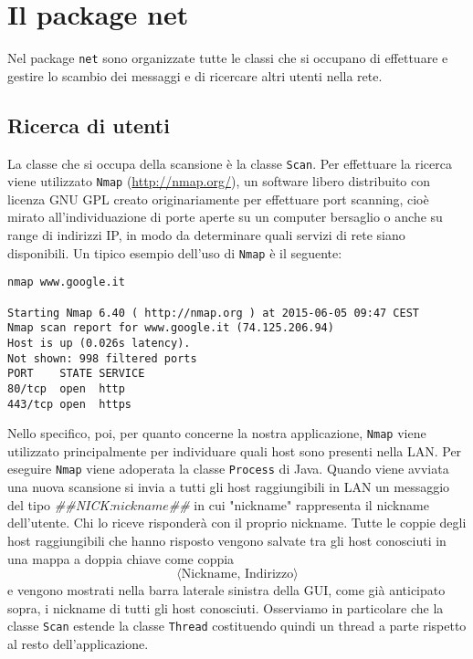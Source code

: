 \section{Il package net}
Nel package \texttt{net} sono organizzate tutte le classi che si occupano di effettuare e gestire lo
scambio dei messaggi e di ricercare altri utenti nella rete.

\subsection{Ricerca di utenti}
La classe che si occupa della scansione è la classe \texttt{Scan}. Per effettuare la
ricerca viene utilizzato \texttt{Nmap} (\url{http://nmap.org/}),  un software libero distribuito
con licenza GNU GPL creato originariamente per effettuare port scanning, cioè mirato
all'individuazione di porte aperte su un computer bersaglio o anche su range di indirizzi IP,
in modo da determinare quali servizi di rete siano disponibili. Un tipico esempio dell'uso
di \texttt{Nmap} è il seguente:

\begin{lstlisting}
nmap www.google.it

Starting Nmap 6.40 ( http://nmap.org ) at 2015-06-05 09:47 CEST
Nmap scan report for www.google.it (74.125.206.94)
Host is up (0.026s latency).
Not shown: 998 filtered ports
PORT    STATE SERVICE
80/tcp  open  http
443/tcp open  https
\end{lstlisting}

Nello specifico, poi, per quanto concerne la nostra applicazione, \texttt{Nmap}
viene utilizzato principalmente per individuare quali host sono presenti nella LAN.
Per eseguire \texttt{Nmap} viene adoperata la classe \texttt{Process} di Java.
Quando viene avviata una nuova scansione si invia a tutti gli host raggiungibili in LAN
un messaggio del tipo \emph{\#\#NICK:$nickname$\#\#} in cui "nickname" rappresenta il nickname
dell'utente. Chi lo riceve risponderà con il proprio nickname. Tutte le coppie degli 
host raggiungibili che hanno risposto vengono salvate tra gli host conosciuti in una mappa
a doppia chiave come coppia 
$$ \langle \text{Nickname, Indirizzo} \rangle $$
e vengono mostrati nella barra laterale sinistra della GUI, come già anticipato sopra, i
nickname di tutti gli host conosciuti. Osserviamo in particolare che la classe \texttt{Scan}
estende la classe \texttt{Thread} costituendo quindi un thread a parte rispetto al resto
dell'applicazione.

